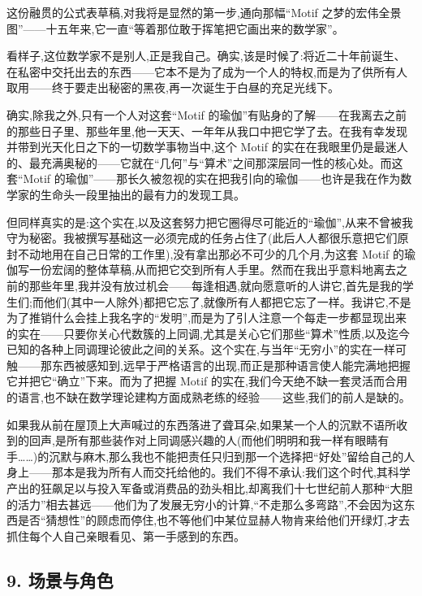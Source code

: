 这份融贯的公式表草稿,对我将是显然的第一步,通向那幅“Motif 之梦的宏伟全景图”——十五年来,它一直“等着那位敢于挥笔把它画出来的数学家”。

 看样子,这位数学家不是别人,正是我自己。确实,该是时候了:将近二十年前诞生、在私密中交托出去的东西——它本不是为了成为一个人的特权,而是为了供所有人取用——终于要走出秘密的黑夜,再一次诞生于白昼的充足光线下。

确实,除我之外,只有一个人对这套“Motif 的瑜伽”有贴身的了解——在我离去之前的那些日子里、那些年里,他一天天、一年年从我口中把它学了去。在我有幸发现并带到光天化日之下的一切数学事物当中,这个 Motif 的实在在我眼里仍是最迷人的、最充满奥秘的——它就在“几何”与“算术”之间那深层同一性的核心处。而这套“Motif 的瑜伽”——那长久被忽视的实在把我引向的瑜伽——也许是我在作为数学家的生命头一段里抽出的最有力的发现工具。

但同样真实的是:这个实在,以及这套努力把它圈得尽可能近的“瑜伽”,从来不曾被我守为秘密。我被撰写基础这一必须完成的任务占住了(此后人人都很乐意把它们原封不动地用在自己日常的工作里),没有拿出那必不可少的几个月,为这套 Motif 的瑜伽写一份宏阔的整体草稿,从而把它交到所有人手里。然而在我出乎意料地离去之前的那些年里,我并没有放过机会——每逢相遇,就向愿意听的人讲它,首先是我的学生们;而他们(其中一人除外)都把它忘了,就像所有人都把它忘了一样。我讲它,不是为了推销什么会挂上我名字的“发明”,而是为了引人注意一个每走一步都显现出来的实在——只要你关心代数簇的上同调,尤其是关心它们那些“算术”性质,以及迄今已知的各种上同调理论彼此之间的关系。这个实在,与当年“无穷小”的实在一样可触——那东西被感知到,远早于严格语言的出现,而正是那种语言使人能完满地把握它并把它“确立”下来。而为了把握 Motif 的实在,我们今天绝不缺一套灵活而合用的语言,也不缺在数学理论建构方面成熟老练的经验——这些,我们的前人是缺的。

如果我从前在屋顶上大声喊过的东西落进了聋耳朵,如果某一个人的沉默不语所收到的回声,是所有那些装作对上同调感兴趣的人(而他们明明和我一样有眼睛有手……)的沉默与麻木,那么我也不能把责任只归到那一个选择把“好处”留给自己的人身上——那本是我为所有人而交托给他的。我们不得不承认:我们这个时代,其科学产出的狂飙足以与投入军备或消费品的劲头相比,却离我们十七世纪前人那种“大胆的活力”相去甚远——他们为了发展无穷小的计算,“不走那么多弯路”,不会因为这东西是否“猜想性”的顾虑而停住,也不等他们中某位显赫人物肯来给他们开绿灯,才去抓住每个人自己亲眼看见、第一手感到的东西。

\subsection{9. 场景与角色}

